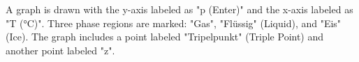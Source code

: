 A graph is drawn with the y-axis labeled as "p (Enter)" and the x-axis labeled as "T (°C)". Three phase regions are marked: "Gas", "Flüssig" (Liquid), and "Eis" (Ice). The graph includes a point labeled "Tripelpunkt" (Triple Point) and another point labeled "z".